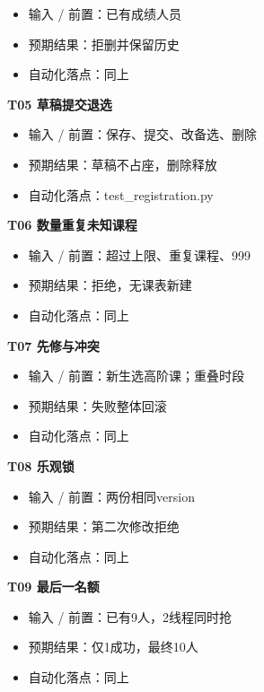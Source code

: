 \documentclass[UTF8,11pt,a4paper]{ctexart}
\providecommand{\tightlist}{\setlength{\itemsep}{0pt}\setlength{\parskip}{0pt}}
\begin{document}
\begin{itemize}
\tightlist
\item
  输入 / 前置：已有成绩人员
\item
  预期结果：拒删并保留历史
\item
  自动化落点：同上
\end{itemize}

\textbf{T05 草稿提交退选}

\begin{itemize}
\tightlist
\item
  输入 / 前置：保存、提交、改备选、删除
\item
  预期结果：草稿不占座，删除释放
\item
  自动化落点：test\_\allowbreak{}registration.py
\end{itemize}

\textbf{T06 数量重复未知课程}

\begin{itemize}
\tightlist
\item
  输入 / 前置：超过上限、重复课程、999
\item
  预期结果：拒绝，无课表新建
\item
  自动化落点：同上
\end{itemize}

\textbf{T07 先修与冲突}

\begin{itemize}
\tightlist
\item
  输入 / 前置：新生选高阶课；重叠时段
\item
  预期结果：失败整体回滚
\item
  自动化落点：同上
\end{itemize}

\textbf{T08 乐观锁}

\begin{itemize}
\tightlist
\item
  输入 / 前置：两份相同version
\item
  预期结果：第二次修改拒绝
\item
  自动化落点：同上
\end{itemize}

\textbf{T09 最后一名额}

\begin{itemize}
\tightlist
\item
  输入 / 前置：已有9人，2线程同时抢
\item
  预期结果：仅1成功，最终10人
\item
  自动化落点：同上
\end{itemize}
\end{document}
